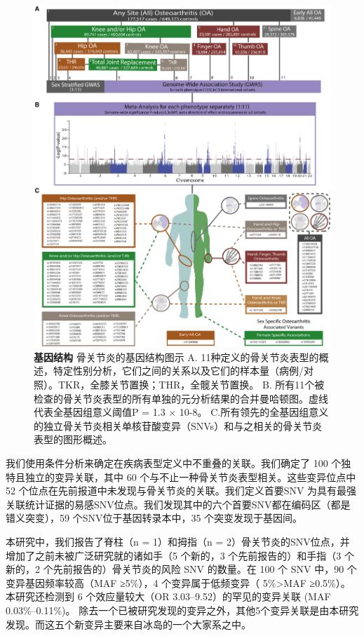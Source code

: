 \begin{figure}[!ht]
	\centering
	\includegraphics[width=\textwidth]{./figures/Appendix/f1.jpg}
	\caption{\textbf{基因结构} 骨关节炎的基因结构图示 A. 11种定义的骨关节炎表型的概述，特定性别分析，它们之间的关系以及它们的样本量（病例/对照）。TKR，全膝关节置换；THR，全髋关节置换。
    B. 所有11个被检查的骨关节炎表型的所有单独的元分析结果的合并曼哈顿图。虚线代表全基因组意义阈值P = 1.3 × 10-8。
    C.所有领先的全基因组意义的独立骨关节炎相关单核苷酸变异（SNVs）和与之相关的骨关节炎表型的图形概述。}
    \label{fig:app_1}
\end{figure}

我们使用条件分析来确定在疾病表型定义中不重叠的关联。我们确定了 100
个独特且独立的变异关联，其中 60
个与不止一种骨关节炎表型相关。这些变异位点中 52
个位点在先前报道中未发现与骨关节炎的关联。我们定义首要SNV
为具有最强关联统计证据的易感SNV位点。我们发现其中的六个首要SNV都在编码区（都是错义突变），59
个SNV位于基因转录本中，35 个突变发现于基因间。

本研究中，我们报告了脊柱（n = 1）和拇指（n =
2）骨关节炎的SNV位点，并增加了之前未被广泛研究就的诸如手（5 个新的，3
个先前报告的）和手指（3 个新的，2 个先前报告的）骨关节炎的风险 SNV
的数量。在 100 个 SNV 中，90 个变异基因频率较高（MAF ≥5\%），4
个变异属于低频变异（ 5\%\textgreater MAF ≥0.5\%）。本研究还检测到 6
个效应量较大（OR 3.03--9.52）的罕见的变异关联 (MAF 0.03\%--0.11\%)。
除去一个已被研究发现的变异之外，其他5个变异关联是由本研究发现。而这五个新变异主要来自冰岛的一个大家系之中。

